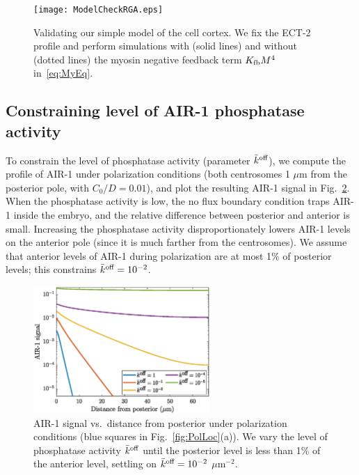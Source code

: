\documentclass[11pt]{article}
\begin{document}
\begin{appendix}
\begin{figure}
\centering
\texttt{[image: ModelCheckRGA.eps]}
\caption{\label{fig:CortexMod}Validating our simple model of the cell cortex. We fix the ECT-2 profile and perform simulations with (solid lines) and without (dotted lines) the myosin negative feedback term $K_\text{fb} M^4$ in\ \eqref{eq:MyEq}. }
\end{figure}

\subsection{Constraining level of AIR-1 phosphatase activity}
To constrain the level of phosphatase activity (parameter $\bar{k}^\text{off}$), we compute the profile of AIR-1 under polarization conditions (both centrosomes 1 $\mu$m from the posterior pole, with $C_0/D=0.01$), and plot the resulting AIR-1 signal in Fig.\ \ref{fig:AIR1ProfKoff}. When the phosphatase activity is low, the no flux boundary condition traps AIR-1 inside the embryo, and the relative difference between posterior and anterior is small. Increasing the phosphatase activity disproportionately lowers AIR-1 levels on the anterior pole (since it is much farther from the centrosomes). We assume that anterior levels of AIR-1 during polarization are at most 1\% of posterior levels; this constrains $\bar{k}^\text{off}=10^{-2}$. 

\begin{figure}
\centering
\includegraphics[width=0.6\textwidth]{Glotzer/PolarizationKoffAir.eps}
\caption{\label{fig:AIR1ProfKoff}AIR-1 signal vs.\ distance from posterior under polarization conditions (blue squares in Fig.\ \ref{fig:PolLoc}(a)). We vary the level of phosphatase activity $\bar{k}^\text{off}$ until the posterior level is less than 1\% of the anterior level, settling on $\bar{k}^\text{off}=10^{-2}$ $\mu$m$^{-2}$.}
\end{figure}



\end{appendix}
\end{document}
